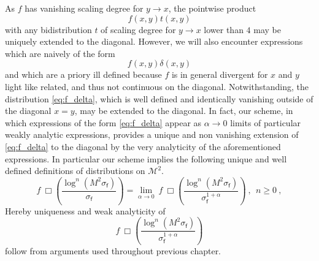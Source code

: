 \documentclass[12pt]{book}
\newcommand{\Mcal}{\mathcal{M}}
\newcommand{\fsf}{\mathsf{f}}
\theoremstyle{break}
\begin{document}
As $f$ has vanishing scaling degree for $y \to x$, the pointwise product 
%
\begin{equation*}
f(x,y) t(x,y) 
\end{equation*}
%
with any bidistribution $t$ of scaling degree for $y\to x$ lower than $4$ may be uniquely extended to the diagonal. However, we will also encounter expressions which are naively of the form 
%
\begin{equation}
f(x,y) \delta(x,y) 
\label{eq:f_delta}
\end{equation}
%
and which are a priory ill defined because $f$ is in general divergent for $x$ and $y$ light like related, and thus not continuous on the diagonal. Notwithstanding, the distribution \eqref{eq:f_delta}, which is well defined and identically vanishing outside of the diagonal $x=y$, may be extended to the diagonal. In fact, our scheme, in which expressions of the form \eqref{eq:f_delta} appear as $\alpha \to 0$ limits of particular weakly analytic expressions, provides a unique and non vanishing extension of \eqref{eq:f_delta} to the diagonal by the very analyticity of the aforementioned expressions. In particular our scheme implies the following unique and well defined definitions of distributions on $\Mcal^2$.
%
\begin{equation}
f \ \Box \left( \frac{\log^n (M^2 \sigma_\fsf) }{\sigma_\fsf} \right) = \lim_{\alpha \to 0} \ f \ \Box \left(\frac{\log^n(M^2 \sigma_\fsf)}{\sigma^{1+\alpha}_\fsf} \right) \ , \ \ n \geq 0 \ ,
\label{eq:f_dists}
\end{equation}
%
Hereby uniqueness and weak analyticity of 
%
\begin{equation*}
f \ \Box\left( \frac{ \log^n(M^2 \sigma_\fsf) }{ \sigma^{1+\alpha}_\fsf } \right) 
\end{equation*}
%
follow from arguments used throughout previous chapter.


\bigskip
\end{document}
